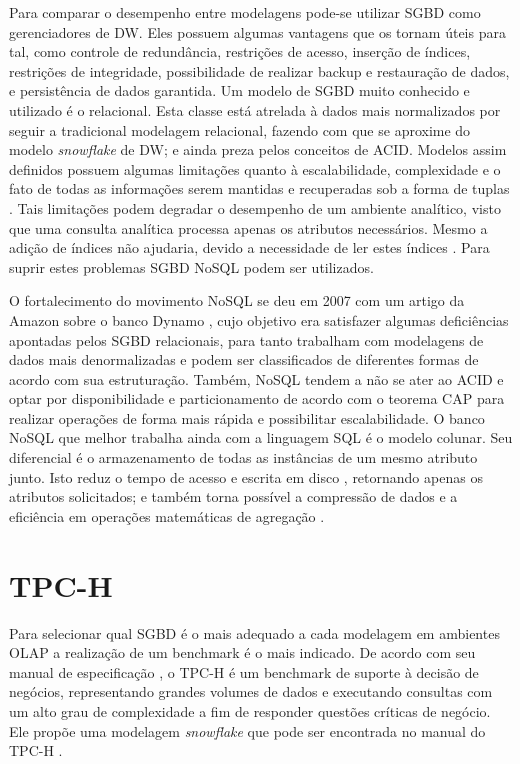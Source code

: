 \documentclass[12pt]{article}
\begin{document}
Para comparar o desempenho entre modelagens pode-se utilizar SGBD como gerenciadores de DW.
Eles possuem algumas vantagens que os tornam úteis para tal, como controle de redundância, restrições de acesso, 
inserção de índices, restrições de integridade, possibilidade de realizar backup e restauração de dados, e persistência 
de dados garantida. Um modelo de SGBD muito conhecido e utilizado é o relacional. Esta classe está atrelada à dados 
mais normalizados por seguir a tradicional modelagem relacional, fazendo com que se aproxime do modelo \textit{snowflake} de DW; 
e ainda preza pelos conceitos de ACID. Modelos 
assim definidos possuem algumas limitações quanto à escalabilidade, complexidade e o fato de todas as informações serem 
mantidas e recuperadas sob a forma de tuplas \cite{leavitt2010will}. Tais limitações podem degradar o desempenho de 
um ambiente analítico, visto que uma consulta analítica processa apenas os atributos necessários. Mesmo a adição de 
índices não ajudaria, devido a necessidade de ler estes índices \cite{matei2010column}. Para suprir estes problemas 
SGBD NoSQL podem ser utilizados.

O fortalecimento do movimento NoSQL se deu em 2007 com um artigo da Amazon sobre o banco Dynamo 
\cite{decandia2007dynamo, leavitt2010will}, cujo objetivo era satisfazer algumas deficiências apontadas 
pelos SGBD relacionais, para tanto trabalham com modelagens de dados mais denormalizadas e podem ser classificados 
de diferentes formas de acordo com sua estruturação. Também, NoSQL tendem a não se ater ao ACID e optar por disponibilidade e particionamento 
de acordo com o teorema CAP \cite{brewer2000towards} para realizar operações de forma mais rápida e possibilitar escalabilidade. 
O banco NoSQL que melhor trabalha ainda com a linguagem SQL é o modelo colunar. Seu 
diferencial é o armazenamento de todas as instâncias de um mesmo atributo junto. Isto reduz o tempo de acesso e 
escrita em disco \cite{matei2010column, abadi2008query}, retornando apenas os atributos solicitados; e também 
torna possível a compressão de dados \cite{abadi2006integrating} e a eficiência em operações 
matemáticas de agregação \cite{matei2010column}.

\section{TPC-H}
Para selecionar qual SGBD é o mais adequado a cada modelagem em ambientes OLAP a 
realização de um benchmark é o mais indicado. De acordo com seu manual de especificação \cite{tpc2017specs}, o TPC-H 
é um benchmark de suporte à decisão de negócios, representando grandes volumes de dados e executando 
consultas com um alto grau de complexidade a fim de responder questões críticas de negócio. Ele propõe 
uma modelagem \textit{snowflake} que pode ser encontrada no manual do TPC-H \cite{tpc2017specs}.
\end{document}

